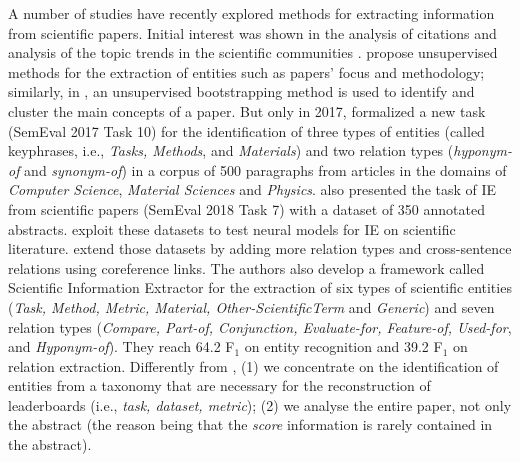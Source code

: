 \documentclass[11pt,a4paper]{article}
\begin{document}
A number of studies have recently explored methods for extracting information from scientific papers. 
Initial interest was shown in the analysis of citations \cite{athar-teufel:2012,athar-teufel:2012:DSSD,jurgens-etal-2018-measuring} and analysis of the topic trends in the scientific communities \cite{W12-3204}.   
\citet{gupta2011analyzing,GBOR16.870} propose unsupervised methods for the extraction of entities such as papers' focus and methodology; similarly, in \cite{Tsai:2013:}, an unsupervised bootstrapping method is used to identify and cluster the main concepts of a paper.
But only in 2017,  formalized a new task (SemEval 2017 Task 10) for the identification of three types of entities (called keyphrases, i.e., \textit{Tasks, Methods}, and \textit{Materials}) and two relation types (\textit{hyponym-of} and \textit{synonym-of}) in a corpus of 500 paragraphs from articles in the domains of \emph{Computer Science}, \emph{Material Sciences} and \emph{Physics}.  also presented the task of IE from scientific papers (SemEval 2018 Task 7) with a dataset of 350 annotated abstracts. 
 \citet{Ammar2017,Ammar2018,Luan2017,Augustein2017Acl} exploit these datasets to test neural models for IE on scientific literature.
\citet{Luan2018} extend those datasets by adding more relation types and cross-sentence relations using coreference links. The authors also develop a framework called Scientific Information Extractor for the extraction of six types of scientific entities (\textit{Task, Method, Metric, Material, Other-ScientificTerm} and \textit{Generic}) and seven relation types (\textit{Compare, Part-of, Conjunction, Evaluate-for, Feature-of, Used-for}, and \textit{Hyponym-of}). They reach 64.2 F$_1$ on entity recognition and 39.2 F$_1$ on relation extraction.
Differently from \cite{Luan2018}, (1) we concentrate on the identification of entities from a taxonomy that are necessary for the reconstruction of leaderboards (i.e., \textit{task, dataset, metric}); (2) we analyse the entire paper, not only the abstract (the reason being that the \textit{score} information is rarely contained in the abstract).
\end{document}
